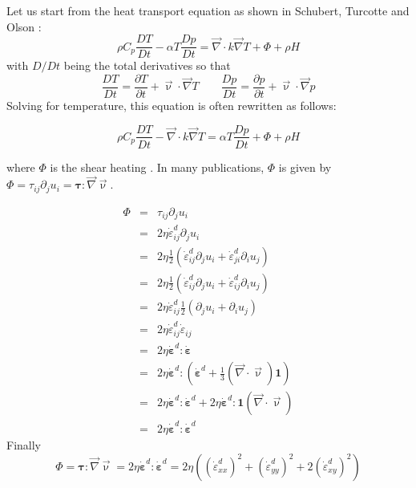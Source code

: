 Let us start from the heat transport equation as shown in Schubert, Turcotte and Olson \cite{scto01}:
\begin{equation}
\rho C_p \frac{DT}{Dt} - \alpha T \frac{Dp}{Dt} = {\vec \nabla} \cdot k {\vec \nabla} T + \Phi + \rho H  
\end{equation}
with $D/Dt$ being the total derivatives so that 
\begin{equation}
\frac{DT}{Dt} = \frac{\partial T}{\partial t} + {\vec \upnu}\cdot {\vec \nabla}T
\quad\quad
\frac{Dp}{Dt} = \frac{\partial p}{\partial t} + {\vec \upnu}\cdot {\vec \nabla}p
\end{equation}
Solving for temperature, this equation is often rewritten as follows:
\begin{mdframed}[backgroundcolor=blue!5]
\begin{equation}
\rho C_p \frac{DT}{Dt} - {\vec \nabla} \cdot k {\vec \nabla} T =  \alpha T \frac{Dp}{Dt} + \Phi + \rho H  
\end{equation}
\end{mdframed}
where $\Phi$ is the shear heating \cite[p287]{reddybook2}. In many publications, $\Phi$ 
is given by $\Phi=\tau_{ij}\partial_j u_i={\bm \tau}:{\vec \nabla}{\vec \upnu}$.

\begin{eqnarray}
\Phi 
&=& \tau_{ij}\partial_j u_i \nonumber\\
&=& 2 \eta \dot{\varepsilon}_{ij}^d\partial_j u_i \nonumber\\
&=& 2 \eta \frac{1}{2}\left( \dot{\varepsilon}_{ij}^d\partial_j u_i + \dot{\varepsilon}_{ji}^d\partial_i u_j \right) \nonumber\\
&=& 2 \eta \frac{1}{2}\left( \dot{\varepsilon}_{ij}^d\partial_j u_i + \dot{\varepsilon}_{ij}^d\partial_i u_j \right) \nonumber\\
&=& 2 \eta  \dot{\varepsilon}_{ij}^d  \frac{1}{2}\left(\partial_j u_i + \partial_i u_j \right) \nonumber\\
&=& 2 \eta  \dot{\varepsilon}_{ij}^d   \dot{\varepsilon}_{ij} \nonumber\\
&=& 2 \eta  \dot{\bm \varepsilon}^d :  \dot{\bm \varepsilon} \nonumber\\
&=& 2 \eta  \dot{\bm \varepsilon}^d : \left( \dot{\bm \varepsilon}^d +\frac{1}{3} ({\vec \nabla}\cdot{\vec \upnu}) {\bm 1} \right)\nonumber\\
&=& 2 \eta  \dot{\bm \varepsilon}^d : \dot{\bm \varepsilon}^d 
+ 2 \eta  \dot{\bm \varepsilon}^d : {\bm 1} ({\vec \nabla}\cdot{\vec \upnu}) \nonumber\\ 
&=& 2 \eta  \dot{\bm \varepsilon}^d : \dot{\bm \varepsilon}^d 
\end{eqnarray}
Finally
\[
\Phi = {\bm \tau}:{\vec \nabla}{\vec \upnu} = 2 \eta  \dot{\bm \varepsilon}^d : \dot{\bm \varepsilon}^d
= 2 \eta \left( (\dot{\varepsilon}_{xx}^d)^2 + (\dot{\varepsilon}_{yy}^d)^2 + 2(\dot{\varepsilon}_{xy}^d)^2 \right)
\]

